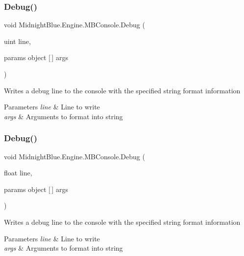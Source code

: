 \subsubsection{\texorpdfstring{Debug()}{Debug()}\hspace{0.1cm}{\footnotesize\ttfamily [3/4]}}
{\footnotesize\ttfamily void Midnight\+Blue.\+Engine.\+M\+B\+Console.\+Debug (\begin{DoxyParamCaption}\item[{uint}]{line,  }\item[{params object \mbox{[}$\,$\mbox{]}}]{args }\end{DoxyParamCaption})\hspace{0.3cm}{\ttfamily [inline]}}



Writes a debug line to the console with the specified string format information 


\begin{DoxyParams}{Parameters}
{\em line} & Line to write\\
\hline
{\em args} & Arguments to format into string\\
\hline
\end{DoxyParams}
\hypertarget{class_midnight_blue_1_1_engine_1_1_m_b_console_a5895255e34603b7957c05313cc0e5639}{}\label{class_midnight_blue_1_1_engine_1_1_m_b_console_a5895255e34603b7957c05313cc0e5639} 
\subsubsection{\texorpdfstring{Debug()}{Debug()}\hspace{0.1cm}{\footnotesize\ttfamily [4/4]}}
{\footnotesize\ttfamily void Midnight\+Blue.\+Engine.\+M\+B\+Console.\+Debug (\begin{DoxyParamCaption}\item[{float}]{line,  }\item[{params object \mbox{[}$\,$\mbox{]}}]{args }\end{DoxyParamCaption})\hspace{0.3cm}{\ttfamily [inline]}}



Writes a debug line to the console with the specified string format information 


\begin{DoxyParams}{Parameters}
{\em line} & Line to write\\
\hline
{\em args} & Arguments to format into string\\
\hline
\end{DoxyParams}
\hypertarget{class_midnight_blue_1_1_engine_1_1_m_b_console_a807e956ca8a90cbcefb785e062d72b2d}{}\label{class_midnight_blue_1_1_engine_1_1_m_b_console_a807e956ca8a90cbcefb785e062d72b2d} 
